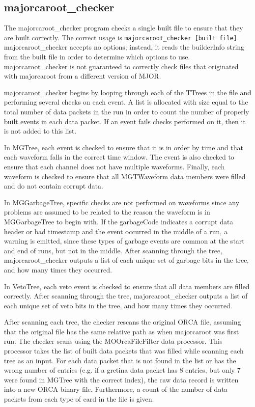 \documentclass[/main.tex]{subfiles}
\begin{document}
\subsection{majorcaroot\_checker}
The majorcaroot\_checker program checks a single built file to ensure that they are built correctly.
The correct usage is \texttt{majorcaroot\_checker [built file]}.
majorcaroot\_checker accepts no options; instead, it reads the builderInfo string from the built file in order to determine which options to use.
majorcaroot\_checker is not guaranteed to correctly check files that originated with majorcaroot from a different version of MJOR.
\par
majorcaroot\_checker begins by looping through each of the TTrees in the file and performing several checks on each event.
A list is allocated with size equal to the total number of data packets in the run in order to count the number of properly built events in each data packet.
If an event fails checks performed on it, then it is not added to this list.
\par
In MGTree, each event is checked to ensure that it is in order by time and that each waveform falls in the correct time window.
The event is also checked to ensure that each channel does not have multiple waveforms.
Finally, each waveform is checked to ensure that all MGTWaveform data members were filled and do not contain corrupt data.
\par
In MGGarbageTree, specific checks are not performed on waveforms since any problems are assumed to be related to the reason the waveform is in MGGarbageTree to begin with.
If the garbageCode indicates a corrupt data header or bad timestamp and the event occurred in the middle of a run, a warning is emitted, since these types of garbage events are common at the start and end of runs, but not in the middle.
After scanning through the tree, majorcaroot\_checker outputs a list of each unique set of garbage bits in the tree, and how many times they occurred.
\par
In VetoTree, each veto event is checked to ensure that all data members are filled correctly.
After scanning through the tree, majorcaroot\_checker outputs a list of each unique set of veto bits in the tree, and how many times they occurred.
\par
After scanning each tree, the checker rescans the original ORCA file, assuming that the original file has the same relative path as when majorcaroot was first run.
The checker scans using the MOOrcaFileFilter data processor.
This processor takes the list of built data packets that was filled while scanning each tree as an input.
For each data packet that is not found in the list or has the wrong number of entries (e.g. if a gretina data packet has 8 entries, but only 7 were found in MGTree with the correct index), the raw data record is written into a new ORCA binary file.
Furthermore, a count of the number of data packets from each type of card in the file is given.
\end{document}
